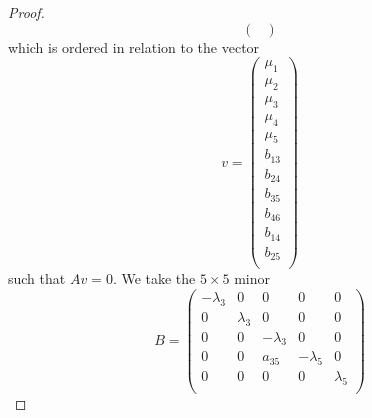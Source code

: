 \documentclass[12pt,fleqn]{article}
\begin{document}
\begin{proof}
\[\begin{pmatrix}
\end{pmatrix}\]
which is ordered in relation to the vector \[
v=\begin{pmatrix}
\mu_1\\
\mu_2\\
\mu_3\\
\mu_4\\
\mu_5\\
b_{13}\\
b_{24}\\
b_{35}\\
b_{46}\\
b_{14}\\
b_{25}\\
\end{pmatrix}
\]
such that $Av=0$. We take the $5\times 5$ minor \[
B=\begin{pmatrix}
-\lambda_3 & 0 & 0 & 0 & 0\\
0 & \lambda_3 & 0 & 0 & 0\\
0 & 0 & -\lambda_3 & 0 & 0\\
0 & 0 & a_{35} & -\lambda_5 & 0\\
0 & 0 & 0 & 0 & \lambda_5\\
\end{pmatrix}
\]

\end{proof}
\end{document}
